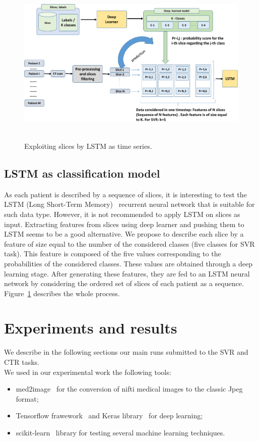 \documentclass{llncs}
\begin{document}
\begin{figure}[!ht]
\includegraphics[width=\textwidth,height=8cm]{lstm.pdf}
\caption{Exploiting slices by LSTM as time series.} 
\label{fig:lstm}
\end{figure}

\subsection{LSTM as classification model}
\label{lstm}
As each patient is described by a sequence of slices, it is interesting to test the LSTM (Long Short-Term Memory)~\cite{lstm1997} recurrent neural network that is suitable for such data type. However, it is not recommended to apply LSTM on slices as input. Extracting features from slices using deep learner and pushing them to LSTM seems to be a good alternative. We propose to describe each slice by a feature of size equal to the number of the considered classes (five classes for SVR task). This feature is composed of the five values corresponding to the probabilities of the considered classes. These values are obtained through a deep learning stage. After generating these features, they are fed to an LSTM neural network by considering the ordered set of slices of each patient as a sequence. Figure~\ref{fig:lstm} describes the whole process.



\section{Experiments and results}
We describe in the following sections our main runs submitted to the SVR and CTR tasks.\\

We used in our experimental work the following tools:
\begin{itemize}
\item med2image~\cite{med2image} for the conversion of nifti medical images to the classic Jpeg format;
\item Tensorflow frawework~\cite{tensorflow2015} and Keras library~\cite{keras2015} for deep learning;
\item scikit-learn~\cite{scikit-learn} library for testing several machine learning techniques.

\end{itemize}
\end{document}
